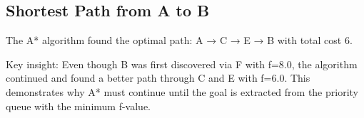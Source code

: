 \documentclass{article}
\begin{document}
\subsection{Shortest Path from A to B}
The A* algorithm found the optimal path: A → C → E → B with total cost 6.

Key insight: Even though B was first discovered via F with f=8.0, the algorithm continued and found a better path through C and E with f=6.0. This demonstrates why A* must continue until the goal is extracted from the priority queue with the minimum f-value.
\end{document}
